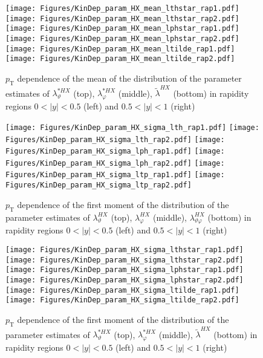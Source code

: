 \documentclass[12pt]{article}
\newcommand{\pT}{p_\mathrm{T}}
\newcommand{\absy}{\left |  y \right |}
\newcommand{\lamthHX}{\lambda^{\scriptscriptstyle HX}_\vartheta}
\newcommand{\lamphHX}{\lambda^{\scriptscriptstyle HX}_\varphi}
\newcommand{\lamthphHX}{\lambda^{\scriptscriptstyle HX}_{\vartheta \varphi}}
\newcommand{\lamtildeHX}{\tilde{\lambda}^{\scriptscriptstyle HX}}
\newcommand{\lamthstarHX}{\lambda^{* \scriptscriptstyle HX}_\vartheta}
\newcommand{\lamphstarHX}{\lambda^{* \scriptscriptstyle HX}_\varphi}
\begin{document}
\begin{figure}[htbp]
\centering
\texttt{[image: Figures/KinDep\_param\_HX\_mean\_lthstar\_rap1.pdf]}
\texttt{[image: Figures/KinDep\_param\_HX\_mean\_lthstar\_rap2.pdf]}
\texttt{[image: Figures/KinDep\_param\_HX\_mean\_lphstar\_rap1.pdf]}
\texttt{[image: Figures/KinDep\_param\_HX\_mean\_lphstar\_rap2.pdf]}
\texttt{[image: Figures/KinDep\_param\_HX\_mean\_ltilde\_rap1.pdf]}
\texttt{[image: Figures/KinDep\_param\_HX\_mean\_ltilde\_rap2.pdf]}
\caption{$\pT$ dependence of the mean of the distribution of the parameter estimates of $\lamthstarHX$ (top), $\lamphstarHX$ (middle), $\lamtildeHX$ (bottom) in rapidity regions $0<\absy<0.5$ (left) and $0.5<\absy<1$ (right)}
\end{figure}
\clearpage


\begin{figure}[htbp]
\centering
\texttt{[image: Figures/KinDep\_param\_HX\_sigma\_lth\_rap1.pdf]}
\texttt{[image: Figures/KinDep\_param\_HX\_sigma\_lth\_rap2.pdf]}
\texttt{[image: Figures/KinDep\_param\_HX\_sigma\_lph\_rap1.pdf]}
\texttt{[image: Figures/KinDep\_param\_HX\_sigma\_lph\_rap2.pdf]}
\texttt{[image: Figures/KinDep\_param\_HX\_sigma\_ltp\_rap1.pdf]}
\texttt{[image: Figures/KinDep\_param\_HX\_sigma\_ltp\_rap2.pdf]}
\caption{$\pT$ dependence of the first moment of the distribution of the parameter estimates of $\lamthHX$ (top), $\lamphHX$ (middle), $\lamthphHX$ (bottom) in rapidity regions $0<\absy<0.5$ (left) and $0.5<\absy<1$ (right)}
\end{figure}
\clearpage

\begin{figure}[htbp]
\centering
\texttt{[image: Figures/KinDep\_param\_HX\_sigma\_lthstar\_rap1.pdf]}
\texttt{[image: Figures/KinDep\_param\_HX\_sigma\_lthstar\_rap2.pdf]}
\texttt{[image: Figures/KinDep\_param\_HX\_sigma\_lphstar\_rap1.pdf]}
\texttt{[image: Figures/KinDep\_param\_HX\_sigma\_lphstar\_rap2.pdf]}
\texttt{[image: Figures/KinDep\_param\_HX\_sigma\_ltilde\_rap1.pdf]}
\texttt{[image: Figures/KinDep\_param\_HX\_sigma\_ltilde\_rap2.pdf]}
\caption{$\pT$ dependence of the first moment of the distribution of the parameter estimates of $\lamthstarHX$ (top), $\lamphstarHX$ (middle), $\lamtildeHX$ (bottom) in rapidity regions $0<\absy<0.5$ (left) and $0.5<\absy<1$ (right)}
\end{figure}
\clearpage
\end{document}
